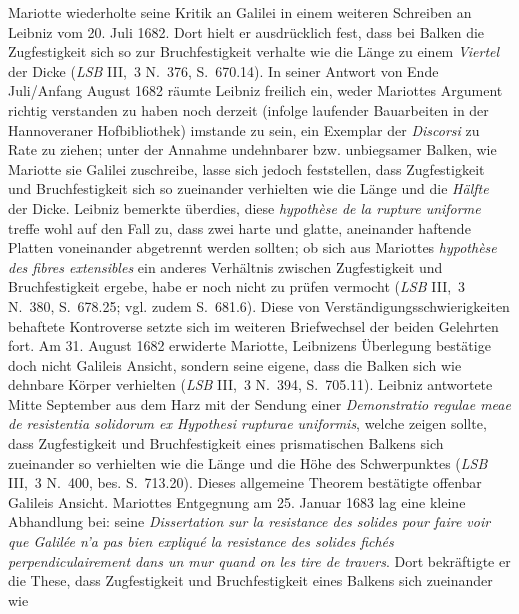 \pend%
\pstart%
Mariotte wiederholte seine Kritik an Galilei in einem weiteren Schreiben an Leibniz vom 20. Juli 1682.
Dort hielt er ausdrücklich fest, dass bei Balken die Zugfestigkeit sich so zur Bruchfestigkeit verhalte wie die Länge zu einem \textit{Viertel} der Dicke (\textit{LSB} III,~3 N.~376, S.~670.14\cite{01233}).
In seiner Antwort von Ende Juli/Anfang August 1682 räumte Leibniz freilich ein, weder Mariottes Argument richtig verstanden zu haben noch derzeit (infolge laufender Bauarbeiten in der Hannoveraner\protect{} Hofbibliothek) imstande zu sein, ein Exemplar der \textit{Discorsi} zu Rate zu ziehen; unter der Annahme undehnbarer bzw. unbiegsamer Balken, wie Mariotte sie Galilei zuschreibe, lasse sich jedoch feststellen, dass Zugfestigkeit und Bruchfestigkeit sich so zueinander verhielten wie die Länge und die \textit{Hälfte} der Dicke.
Leibniz bemerkte überdies, diese \textit{hypothèse de la rupture uniforme} treffe wohl auf den Fall zu, dass zwei harte und glatte, aneinander haftende Platten voneinander abgetrennt werden sollten; ob sich aus Mariottes \textit{hypothèse des fibres extensibles} ein anderes Verhältnis zwischen Zugfestigkeit und Bruchfestigkeit ergebe, habe er noch nicht zu prüfen vermocht (\textit{LSB} III,~3 N.~380, S.~678.25; vgl. zudem S.~681.6)\cite{01263}.
\pend%
\pstart%
Diese von Verständigungsschwierigkeiten behaftete Kontroverse setzte sich im weiteren Briefwechsel der beiden Gelehrten fort.
Am 31. August 1682 erwiderte Mariotte, Leibnizens Überlegung bestätige doch nicht Galileis Ansicht, sondern seine eigene, dass die Balken sich wie dehnbare Körper verhielten (\textit{LSB} III,~3 N.~394, S.~705.11\cite{01340}).
Leibniz antwortete Mitte September aus dem Harz mit der Sendung einer \textit{Demonstratio regulae meae de resistentia solidorum ex Hypothesi rupturae uniformis}, welche zeigen sollte, dass Zugfestigkeit und Bruchfestigkeit eines prismatischen Balkens sich zueinander so verhielten wie die Länge und die Höhe des Schwerpunktes (\textit{LSB} III,~3 N.~400, bes. S.~713.20).\cite{01264}
Dieses allgemeine Theorem bestätigte offenbar Galileis Ansicht.
Mariottes Entgegnung am 25. Januar 1683 lag eine kleine Abhandlung bei: seine \textit{Dissertation sur la resistance des solides pour faire voir que Galilée n'a pas bien expliqué la resistance des solides fichés perpendiculairement dans un mur quand on les tire de travers}.
Dort bekräftigte er die These, dass Zugfestigkeit und Bruchfestigkeit eines Balkens sich zueinander wie
